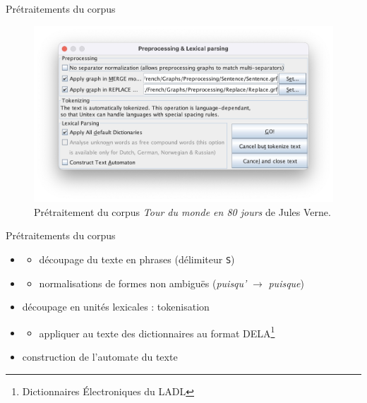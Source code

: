 \documentclass[xetex,xcolor={table,usenames,dvipsnames}]{beamer}
\begin{document}
\begin{frame}{Prétraitements du corpus}
		\begin{figure}[h] %
		\centering
		\includegraphics[width=0.7\linewidth]{img/pretraitement.png}
		\caption{Prétraitement du corpus \textit{Tour du monde en 80 jours} de Jules Verne.}
		\label{fig:ling_out_TAL}
	\end{figure}
\end{frame}

\begin{frame}{Prétraitements du corpus}
	\begin{itemize}
		\item {} 
		\begin{itemize}
			\item découpage du texte en phrases (délimiteur \texttt{S})
		\end{itemize} 
		\item {} 
		\begin{itemize}
			\item normalisations de formes non ambiguës (\textit{puisqu'} $\rightarrow$ \textit{puisque})
		\end{itemize}
		\item découpage en unités lexicales : tokenisation
		\item {} 
		\begin{itemize}
			\item  appliquer au texte des dictionnaires au format \textsc{DELA}\footnote{Dictionnaires Électroniques du \textsc{LADL}}
		\end{itemize}
		\item construction de l'automate du texte
	\end{itemize}
\end{frame}
\end{document}
